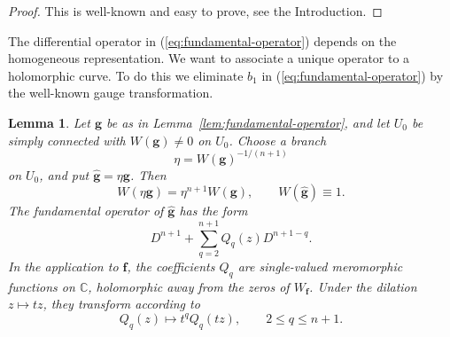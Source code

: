 \documentclass[12pt,letterpaper,reqno]{amsart}
\newtheorem{lem}[thm]{Lemma}
\theoremstyle{definition}
\numberwithin{equation}{section}
\newcommand{\C}{\mathbb C}
\newcommand{\fv}{\bm f}
\newcommand{\gv}{\bm g}
\begin{document}
\begin{proof}
This is well-known and easy to prove, see the Introduction.
\end{proof}

The differential operator in (\ref{eq:fundamental-operator}) depends on
the homogeneous representation. We want to associate a unique operator
to a holomorphic curve. To do this we eliminate $b_1$ in
(\ref{eq:fundamental-operator}) by the well-known gauge transformation.


\begin{lem}\label{lem:canonical-gauge}
Let \(\gv\) be as in Lemma~\ref{lem:fundamental-operator}, and let \(U_0\)
be simply connected with \(W(\gv)\ne0\) on \(U_0\). Choose a branch
\begin{equation}\label{eq:gauge-factor}
\eta=W(\gv)^{-1/(n+1)}
\end{equation}
on \(U_0\), and put \(\widehat{\gv}=\eta\gv\). Then
\begin{equation}\label{eq:wronskian-gauge}
W(\eta\gv)=\eta^{n+1}W(\gv),\qquad
W(\widehat{\gv})\equiv1.
\end{equation}
The fundamental operator of \(\widehat{\gv}\) has the form
\begin{equation}\label{eq:canonical}
D^{n+1}+\sum_{q=2}^{n+1}Q_q(z)D^{n+1-q}.
\end{equation}
In the application to \(\fv\), the coefficients \(Q_q\) are single-valued
meromorphic functions on \(\C\), holomorphic away from the zeros of
\(W_{\fv}\). Under the dilation \(z\mapsto tz\), they transform according to
\begin{equation}\label{eq:scalecoeff}
Q_q(z)\longmapsto t^qQ_q(tz),\qquad 2\le q\le n+1.
\end{equation}
\end{lem}
\end{document}
